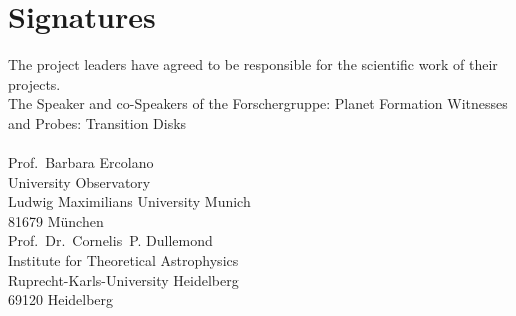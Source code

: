 \documentclass[10pt,fleqn,twoside]{article}
\begin{document}
\section{Signatures}
%
The project leaders have agreed to be responsible for the scientific
work of their projects.\\[0.4cm]
%
\noindent
The Speaker and co-Speakers of the Forschergruppe: Planet Formation
Witnesses and Probes: Transition Disks\\[0.4cm]
% 
\noindent
{\it }
\\[1.0cm]
%
% 
\noindent
Prof.\ Barbara Ercolano \\
University Observatory \\
Ludwig Maximilians University Munich\\
81679  M\"unchen\vspace{1em}\\

\noindent Prof.\ Dr.\ Cornelis~P. Dullemond\\
Institute for Theoretical Astrophysics\\
Ruprecht-Karls-University Heidelberg\\
69120 Heidelberg\vspace{1em}\\
\end{document}
